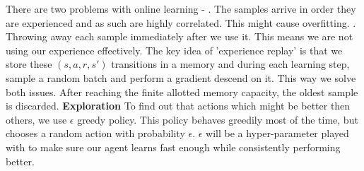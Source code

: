 \newline
There are two problems with online learning - . The samples arrive in order they are experienced and as such are highly correlated. This might cause overfitting.
. Throwing away each sample immediately after we use it. This means we are not using our experience effectively.
\newline
The key idea of 'experience replay' is that we store these $(s, a, r, s')$ transitions in a memory and during each learning step, sample a random batch and perform a gradient descend on it. This way we solve both issues.
After reaching the finite allotted memory capacity, the oldest sample is discarded.
\newline \newline
\textbf{Exploration}
To find out that actions which might be better then others, we use $\epsilon$ greedy policy. This policy behaves greedily most of the time, but chooses a random action with probability $\epsilon$. $\epsilon$ will be a hyper-parameter played with to make sure our agent learns fast enough while consistently performing better.

